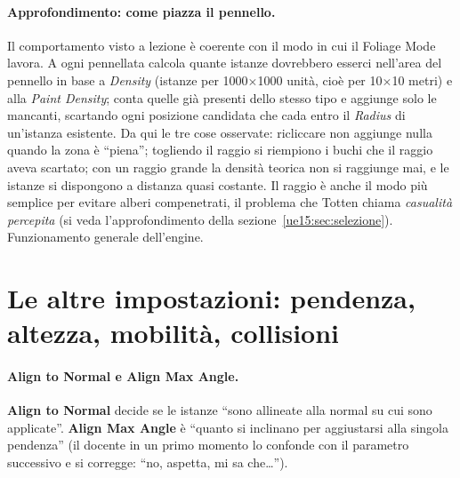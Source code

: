 \paragraph{Approfondimento: come piazza il pennello.} Il comportamento visto a lezione è
coerente con il modo in cui il Foliage Mode lavora. A ogni pennellata calcola quante istanze
dovrebbero esserci nell'area del pennello in base a \emph{Density} (istanze per
1000$\times$1000 unità, cioè per 10$\times$10 metri) e alla \emph{Paint Density}; conta quelle
già presenti dello stesso tipo e aggiunge solo le mancanti, scartando ogni posizione
candidata che cada entro il \emph{Radius} di un'istanza esistente. Da qui le tre cose
osservate: ricliccare non aggiunge nulla quando la zona è ``piena''; togliendo il raggio si
riempiono i buchi che il raggio aveva scartato; con un raggio grande la densità teorica non
si raggiunge mai, e le istanze si dispongono a distanza quasi costante. Il raggio è anche il
modo più semplice per evitare alberi compenetrati, il problema che Totten chiama
\emph{casualità percepita} (si veda l'approfondimento della
sezione~\ref{ue15:sec:selezione}). Funzionamento generale dell'engine.

\section{Le altre impostazioni: pendenza, altezza, mobilità, collisioni}
\label{ue15:sec:altre}

\paragraph{Align to Normal e Align Max Angle.} \textbf{Align to Normal} decide se le istanze
``sono allineate alla normal su cui sono applicate''. \textbf{Align Max Angle} è ``quanto si
inclinano per aggiustarsi alla singola pendenza'' (il docente in un primo momento lo confonde
con il parametro successivo e si corregge: ``no, aspetta, mi sa che\dots'').

